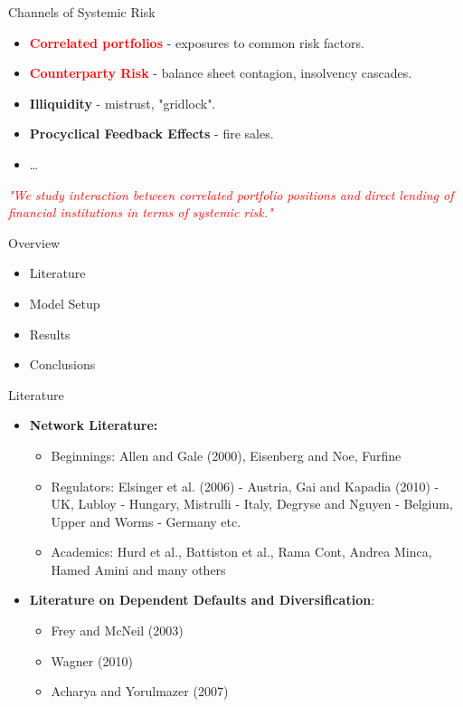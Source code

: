 \documentclass{beamer}
\begin{document}
\begin{frame}{Channels of Systemic Risk}
	\begin{itemize}
		\item \textcolor{red}{\textbf{Correlated portfolios}} - exposures to common risk factors.
		\item \textcolor{red}{\textbf{Counterparty Risk}} - balance sheet contagion, insolvency cascades. 
		\item \textbf{Illiquidity} - mistrust, "gridlock".
		\item \textbf{Procyclical Feedback Effects} - fire sales.
		\item \ldots
	\end{itemize}
	\textcolor{red}{\textit{"We study interaction between correlated portfolio positions and direct lending of financial institutions in terms of systemic risk."
	}}
\end{frame}


\begin{frame}{Overview}
\begin{itemize}
	\item Literature
	\item Model Setup
	\item Results
	\item Conclusions
\end{itemize}
\end{frame}

\begin{frame}{Literature}
	\begin{itemize}
		\item \textbf{Network Literature:}
		\begin{itemize}
			\item Beginnings: Allen and Gale (2000), Eisenberg and Noe, Furfine
			\item Regulators: Elsinger et al. (2006) - Austria, Gai and Kapadia (2010) - UK, Lubloy - Hungary, Mistrulli - Italy, Degryse and Nguyen - Belgium, Upper and Worms - Germany etc.
			\item Academics: Hurd et al., Battiston et al., Rama Cont, Andrea Minca, Hamed Amini and many others
		\end{itemize}
		\item \textbf{Literature on Dependent Defaults and Diversification}:
		\begin{itemize}
			\item Frey and McNeil (2003)
			\item Wagner (2010)
			\item Acharya and Yorulmazer (2007)
		\end{itemize}
	\end{itemize}
\end{frame}
\end{document}
